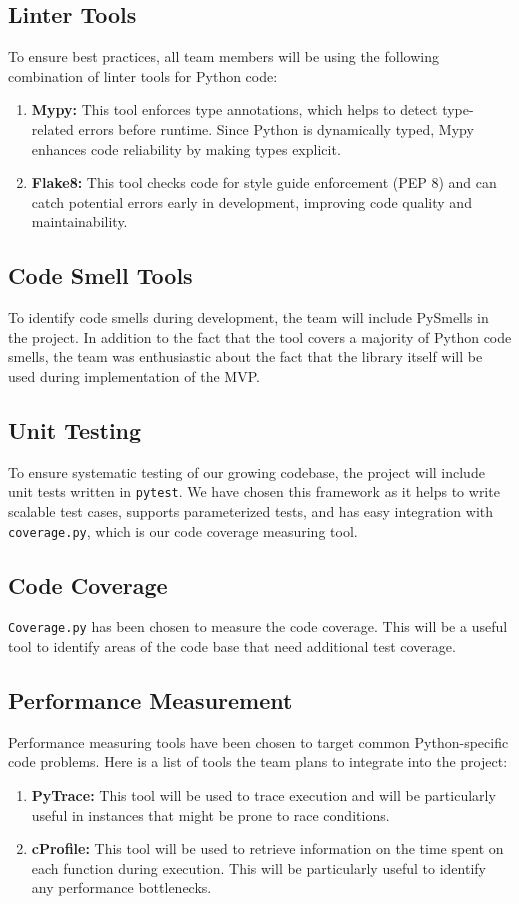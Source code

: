 \documentclass{article}
\begin{document}
\subsection{Linter Tools}
To ensure best practices, all team members will be using the
following combination of linter tools for Python code:
\begin{enumerate}
  \item \textbf{Mypy:} This tool enforces type annotations, which
    helps to detect type-related errors before runtime. Since Python
    is dynamically typed, Mypy enhances code reliability by making
    types explicit.
  \item \textbf{Flake8:} This tool checks code for style guide
    enforcement (PEP 8) and can catch potential errors early in
    development, improving code quality and maintainability.
\end{enumerate}

\subsection{Code Smell Tools}
To identify code smells during development, the team will include
PySmells in the project. In addition to the fact that the tool covers
a majority of Python code smells, the team was enthusiastic about the
fact that the library itself will be used during implementation of the MVP.

\subsection{Unit Testing}
To ensure systematic testing of our growing codebase, the project
will include unit tests written in \texttt{pytest}. We have chosen
this framework as it helps to write scalable test cases, supports
parameterized tests, and has easy integration with
\texttt{coverage.py}, which is our code coverage measuring tool.

\subsection{Code Coverage}
\texttt{Coverage.py} has been chosen to measure the code coverage.
This will be a useful tool to identify areas of the code base that
need additional test coverage.

\subsection{Performance Measurement}
Performance measuring tools have been chosen to target common
Python-specific code problems. Here is a list of tools the team plans
to integrate into the project:
\begin{enumerate}
  \item \textbf{PyTrace:} This tool will be used to trace execution
    and will be particularly useful in instances that might be prone
    to race conditions.
  \item \textbf{cProfile:} This tool will be used to retrieve
    information on the time spent on each function during execution.
    This will be particularly useful to identify any performance bottlenecks.
\end{enumerate}
\end{document}
